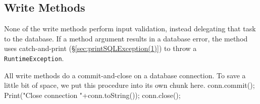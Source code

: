 \documentclass{article}
\def\nwendcode{\endtrivlist \endgroup}      %
\let\nwdocspar=\par
\theoremstyle{definition}                   %
\begin{document}
\subsection{Write Methods}
\label{sec:write-methods}
None of the write methods perform input validation, instead delegating that
task to the database. If a method argument results in a database error, the
method uses catch-and-print (\S\ref{sec:printSQLException(1)}) to throw a
{\tt{}RuntimeException}.

All write methods do a commit-and-close on a database connection. To save
a little bit of space, we put this procedure into its own chunk here.
\nwenddocs{}\endmoddef{}
conn.commit();
Print("Close connection "+conn.toString());
conn.close();
\nwendcode{}\nwdocspar
\end{document}
